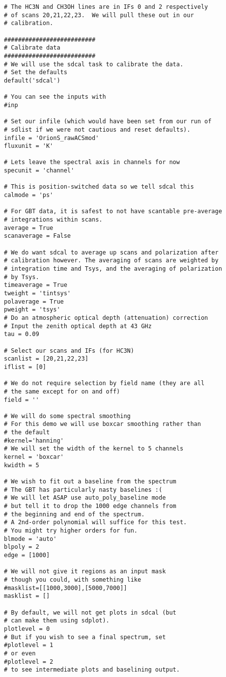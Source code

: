 \begin{verbatim}
# The HC3N and CH3OH lines are in IFs 0 and 2 respectively
# of scans 20,21,22,23.  We will pull these out in our
# calibration.

##########################
# Calibrate data
##########################
# We will use the sdcal task to calibrate the data.
# Set the defaults
default('sdcal')

# You can see the inputs with
#inp

# Set our infile (which would have been set from our run of
# sdlist if we were not cautious and reset defaults).
infile = 'OrionS_rawACSmod'
fluxunit = 'K'

# Lets leave the spectral axis in channels for now
specunit = 'channel'

# This is position-switched data so we tell sdcal this
calmode = 'ps'

# For GBT data, it is safest to not have scantable pre-average
# integrations within scans.
average = True
scanaverage = False

# We do want sdcal to average up scans and polarization after
# calibration however. The averaging of scans are weighted by 
# integration time and Tsys, and the averaging of polarization 
# by Tsys.
timeaverage = True
tweight = 'tintsys'
polaverage = True
pweight = 'tsys'
# Do an atmospheric optical depth (attenuation) correction
# Input the zenith optical depth at 43 GHz
tau = 0.09

# Select our scans and IFs (for HC3N)
scanlist = [20,21,22,23]
iflist = [0]

# We do not require selection by field name (they are all
# the same except for on and off)
field = ''

# We will do some spectral smoothing
# For this demo we will use boxcar smoothing rather than
# the default
#kernel='hanning'
# We will set the width of the kernel to 5 channels
kernel = 'boxcar'
kwidth = 5

# We wish to fit out a baseline from the spectrum
# The GBT has particularly nasty baselines :(
# We will let ASAP use auto_poly_baseline mode
# but tell it to drop the 1000 edge channels from
# the beginning and end of the spectrum.
# A 2nd-order polynomial will suffice for this test.
# You might try higher orders for fun.
blmode = 'auto'
blpoly = 2
edge = [1000]

# We will not give it regions as an input mask
# though you could, with something like
#masklist=[[1000,3000],[5000,7000]]
masklist = []

# By default, we will not get plots in sdcal (but
# can make them using sdplot).
plotlevel = 0
# But if you wish to see a final spectrum, set
#plotlevel = 1
# or even
#plotlevel = 2
# to see intermediate plots and baselining output.


\end{verbatim}
